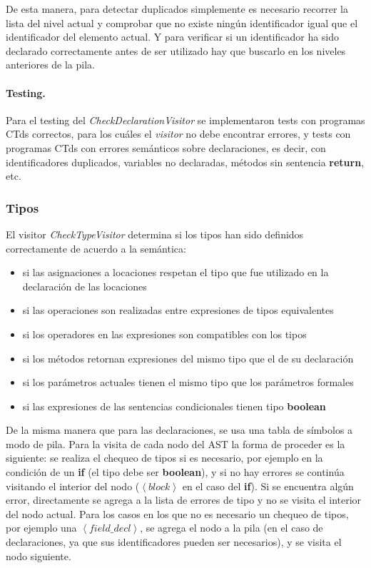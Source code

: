\documentclass[11pt,a4paper]{article}
\begin{document}
De esta manera, para detectar duplicados simplemente es necesario recorrer la lista del nivel actual y comprobar que no existe ningún identificador igual que el identificador del elemento actual. Y para verificar si un identificador ha sido declarado correctamente antes de ser utilizado hay que buscarlo en los niveles anteriores de la pila. 

\paragraph{Testing.} Para el testing del \textit{CheckDeclarationVisitor} se implementaron tests con programas CTds correctos, para los cuáles el \textit{visitor} no debe encontrar errores, y tests con programas CTds con errores semánticos sobre declaraciones, es decir, con identificadores duplicados, variables no declaradas, métodos sin sentencia \textbf{return}, etc.


\subsubsection{Tipos}
\label{subsec:tipos}

El visitor \textit{CheckTypeVisitor} determina si los tipos han sido definidos correctamente de acuerdo a la semántica: 
\begin{itemize}
	\item si las asignaciones a locaciones respetan el tipo que fue utilizado en la declaración de las locaciones
	\item si las operaciones son realizadas entre expresiones de tipos equivalentes
	\item si los operadores en las expresiones son compatibles con los tipos
	\item si los métodos retornan expresiones del mismo tipo que el de su declaración
	\item si los parámetros actuales tienen el mismo tipo que los parámetros formales
	\item si las expresiones de las sentencias condicionales tienen tipo \textbf{boolean}
\end{itemize}

De la misma manera que para las declaraciones, se usa una tabla de símbolos a modo de pila. Para la visita de cada nodo del AST la forma de proceder es la siguiente: se realiza el chequeo de tipos si es necesario, por ejemplo en la condición de un \textbf{if} (el tipo debe ser \textbf{boolean}), y si no hay errores se continúa visitando el interior del nodo ($\left\langle block \right\rangle$ en el caso del \textbf{if}). Si se encuentra algún error, directamente se agrega a la lista de errores de tipo y no se visita el interior del nodo actual. Para los casos en los que no es necesario un chequeo de tipos, por ejemplo una  $\left\langle field\_decl \right\rangle$, se agrega el nodo a la pila (en el caso de declaraciones, ya que sus identificadores pueden ser necesarios), y se visita el nodo siguiente.
\end{document}
